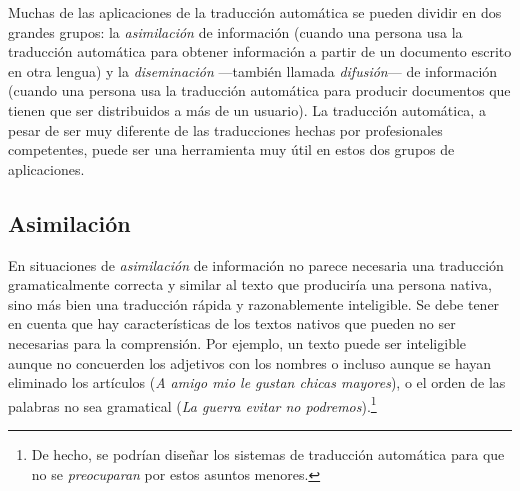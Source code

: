 Muchas de las aplicaciones de la traducción automática se pueden dividir en dos grandes grupos: la \emph{asimilación} de información (cuando una persona usa la traducción automática para obtener información a partir de un documento escrito en otra lengua) y la \emph{diseminación} ---también llamada \emph{difusión}--- de información (cuando una persona usa la traducción automática para producir documentos que tienen que ser distribuidos a más de un usuario). La traducción automática, a pesar de ser muy diferente de las traducciones hechas por profesionales competentes, puede ser una herramienta muy útil en estos dos grupos de aplicaciones. 

\subsection{Asimilación} \label{s3:assim} En situaciones de \emph{asimilación} de información no parece necesaria una traducción gramaticalmente correcta y similar al texto que produciría una persona nativa, sino más bien una traducción rápida y razonablemente inteligible. Se debe tener en cuenta que hay características de los textos nativos que pueden no ser necesarias para la comprensión. Por ejemplo, un texto puede ser inteligible aunque no concuerden los adjetivos con los nombres o incluso aunque se hayan eliminado los artículos (\emph{A amigo mio le gustan chicas mayores}), o el orden de las palabras no sea gramatical (\emph{La guerra evitar no podremos}).\footnote{De hecho, se podrían diseñar los sistemas de traducción automática para que no se \emph{preocuparan} por estos asuntos menores.} 

